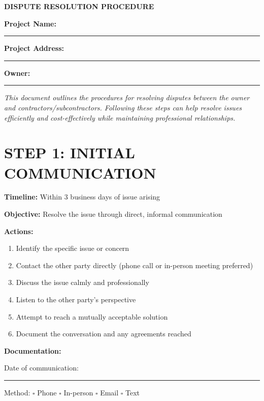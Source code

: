 \documentclass[11pt,letterpaper]{article}
\begin{document}
\begin{center}
\textbf{\Large DISPUTE RESOLUTION PROCEDURE}
\end{center}

\vspace{12pt}

\textbf{Project Name:} \rule{8cm}{0.4pt}

\textbf{Project Address:} \rule{8cm}{0.4pt}

\textbf{Owner:} \rule{9cm}{0.4pt}

\vspace{6pt}

\textit{This document outlines the procedures for resolving disputes between the owner and contractors/subcontractors. Following these steps can help resolve issues efficiently and cost-effectively while maintaining professional relationships.}

\vspace{12pt}

\section*{STEP 1: INITIAL COMMUNICATION}

\textbf{Timeline:} Within 3 business days of issue arising

\textbf{Objective:} Resolve the issue through direct, informal communication

\vspace{6pt}

\textbf{Actions:}

\begin{enumerate}
\item Identify the specific issue or concern
\item Contact the other party directly (phone call or in-person meeting preferred)
\item Discuss the issue calmly and professionally
\item Listen to the other party's perspective
\item Attempt to reach a mutually acceptable solution
\item Document the conversation and any agreements reached
\end{enumerate}

\vspace{6pt}

\textbf{Documentation:}

Date of communication: \rule{4cm}{0.4pt}

Method: $\square$ Phone $\square$ In-person $\square$ Email $\square$ Text
\end{document}
